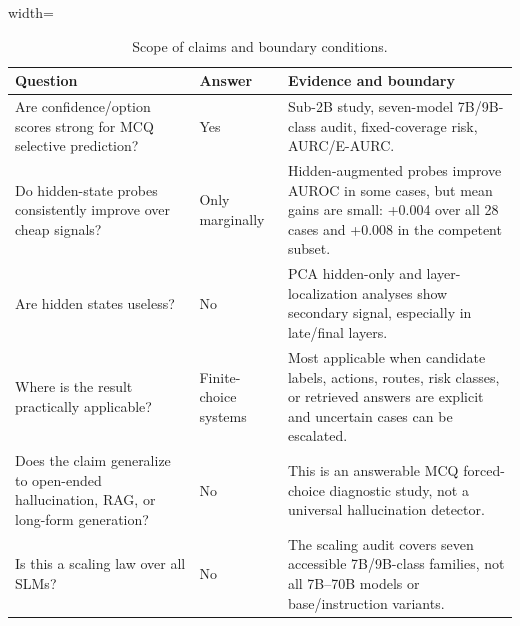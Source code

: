 \begin{table}[t]
\centering
\small
\caption{Scope of claims and boundary conditions.}
\label{tab:scope}
\begin{threeparttable}

\begin{adjustbox}{width=\textwidth}
\begin{tabular}{p{}p{}p{}}
\toprule
Question & Answer & Evidence and boundary \\
\midrule
Are confidence/option scores strong for MCQ selective prediction? & Yes & Sub-2B study, seven-model 7B/9B-class audit, fixed-coverage risk, AURC/E-AURC. \\
Do hidden-state probes consistently improve over cheap signals? & Only marginally & Hidden-augmented probes improve AUROC in some cases, but mean gains are small: +0.004 over all 28 cases and +0.008 in the competent subset. \\
Are hidden states useless? & No & PCA hidden-only and layer-localization analyses show secondary signal, especially in late/final layers. \\
Where is the result practically applicable? & Finite-choice systems & Most applicable when candidate labels, actions, routes, risk classes, or retrieved answers are explicit and uncertain cases can be escalated. \\
Does the claim generalize to open-ended hallucination, RAG, or long-form generation? & No & This is an answerable MCQ forced-choice diagnostic study, not a universal hallucination detector. \\
Is this a scaling law over all SLMs? & No & The scaling audit covers seven accessible 7B/9B-class families, not all 7B--70B models or base/instruction variants. \\
\bottomrule
\end{tabular}
\end{adjustbox}

\end{threeparttable}
\end{table}

